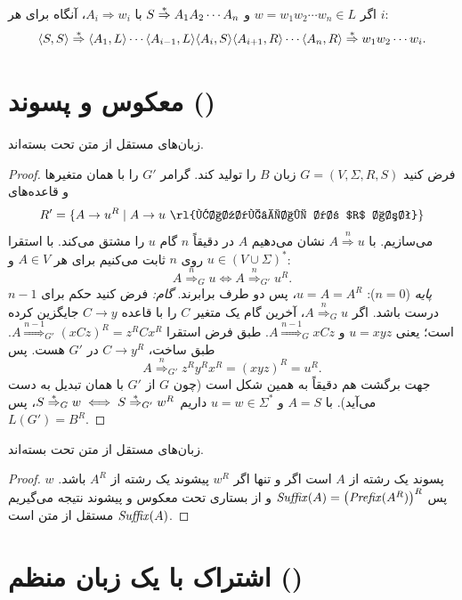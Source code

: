 \begin{example}
اگر $w=w_1w_2\cdots w_n\in L$ و $S\overset{*}{\Rightarrow} A_1A_2\cdots A_n$ با $A_i\Rightarrow w_i$، آنگاه برای هر $i$:
\[\langle S,S\rangle\overset{*}{\Rightarrow}\langle A_1,L\rangle\cdots\langle A_{i-1},L\rangle\langle A_i,S\rangle\langle A_{i+1},R\rangle\cdots\langle A_n,R\rangle\overset{*}{\Rightarrow} w_1w_2\cdots w_i.\]
\end{example}

\section{معکوس و پسوند ()}

\begin{theorem}
زبان‌های مستقل از متن تحت  بسته‌اند.
\end{theorem}
\begin{proof}
فرض کنید $G=(V,\Sigma,R,S)$ زبان $B$ را تولید کند. گرامر $G'$ را با همان متغیرها و قاعده‌های
\[R'=\{A\to u^R\st A\to u\ \text{\rl{قاعده‌ای در $R$ است}}\}\]
می‌سازیم. با $A\overset{n}{\Rightarrow}u$ نشان می‌دهیم $A$ در دقیقاً $n$ گام $u$ را مشتق می‌کند. با استقرا روی $n$ ثابت می‌کنیم برای هر $A\in V$ و $u\in(V\cup\Sigma)^*$:
\[A\overset{n}{\Rightarrow}_G u\iff A\overset{n}{\Rightarrow}_{G'}u^R.\]
\emph{پایه} ($n=0$): $u=A=A^R$، پس دو طرف برابرند.
\emph{گام:} فرض کنید حکم برای $n-1$ درست باشد. اگر $A\overset{n}{\Rightarrow}_G u$، آخرین گام یک متغیر $C$ را با قاعده $C\to y$ جایگزین کرده است؛ یعنی $u=xyz$ و $A\overset{n-1}{\Rightarrow}_G xCz$. طبق فرض استقرا $A\overset{n-1}{\Rightarrow}_{G'}(xCz)^R=z^RCx^R$. طبق ساخت، $C\to y^R$ در $G'$ هست. پس
\[A\overset{n}{\Rightarrow}_{G'}z^Ry^Rx^R=(xyz)^R=u^R.\]
جهت برگشت هم دقیقاً به همین شکل است (چون $G$ از $G'$ با همان تبدیل به دست می‌آید). با $A=S$ و $u=w\in\Sigma^*$ داریم $S\overset{*}{\Rightarrow}_G w\iff S\overset{*}{\Rightarrow}_{G'}w^R$، پس $L(G')=B^R$.
\end{proof}

\begin{theorem}
زبان‌های مستقل از متن تحت  بسته‌اند.
\end{theorem}
\begin{proof}
$w$ پسوند یک رشته از $A$ است اگر و تنها اگر $w^R$ پیشوند یک رشته از $A^R$ باشد. پس $\mathit{Suffix}(A)=\big(\mathit{Prefix}(A^R)\big)^R$ و از بستاری تحت معکوس و پیشوند نتیجه می‌گیریم $\mathit{Suffix}(A)$ مستقل از متن است.
\end{proof}

\section{اشتراک با یک زبان منظم ()}

